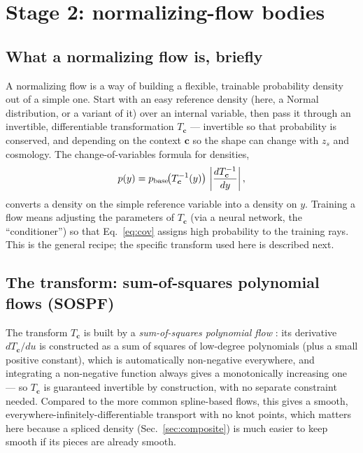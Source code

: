 \documentclass[11pt]{article}
\newcommand{\vect}[1]{\boldsymbol{#1}}
\begin{document}
\section{Stage 2: normalizing-flow bodies}
\label{sec:body}

\subsection{What a normalizing flow is, briefly}

A normalizing flow is a way of building a flexible, trainable probability
density out of a simple one. Start with an easy reference density (here, a
Normal distribution, or a variant of it) over an internal variable, then
pass it through an invertible, differentiable transformation
$T_{\vect c}$ — invertible so that probability is conserved, and depending
on the context $\vect c$ so the shape can change with $z_s$ and cosmology.
The change-of-variables formula for densities,
\begin{equation}
 p(y) = p_{\rm base}\!\big(T_{\vect c}^{-1}(y)\big)\, \left|\frac{d
 T_{\vect c}^{-1}}{dy}\right|,
 \label{eq:cov}
\end{equation}
converts a density on the simple reference variable into a density on $y$.
Training a flow means adjusting the parameters of $T_{\vect c}$ (via a
neural network, the ``conditioner'') so that Eq.~\ref{eq:cov} assigns high
probability to the training rays. This is the general recipe; the specific
transform used here is described next.

\subsection{The transform: sum-of-squares polynomial flows (SOSPF)}

The transform $T_{\vect c}$ is built by a \emph{sum-of-squares polynomial
flow} \cite{jaini2019sum}: its derivative $dT_{\vect c}/du$ is constructed
as a sum of squares of low-degree polynomials (plus a small positive
constant), which is automatically non-negative everywhere, and integrating
a non-negative function always gives a monotonically increasing one — so
$T_{\vect c}$ is guaranteed invertible by construction, with no separate
constraint needed. Compared to the more common spline-based flows, this
gives a smooth, everywhere-infinitely-differentiable transport with no
knot points, which matters here because a spliced density
(Sec.~\ref{sec:composite}) is much easier to keep smooth if its pieces are
already smooth.
\end{document}
